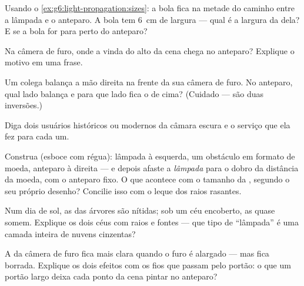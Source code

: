 \begin{exercise}[$\star$]\label{exo:g6:light-propagation:5}
Usando o \cref{ex:g6:light-propagation:sizes}: a bola fica na metade
do caminho entre a lâmpada e o anteparo. A bola tem \qty{6}{cm} de
largura --- qual é a largura da  dela? E se a bola for para
perto do anteparo?
\end{exercise}

\begin{exercise}[$\star$]\label{exo:g6:light-propagation:6}
Na câmera de furo, onde a  vinda do alto da cena chega no
anteparo? Explique o motivo em uma frase.
\end{exercise}

\begin{exercise}[$\star$]\label{exo:g6:light-propagation:7}
Um colega balança a mão direita na frente da sua câmera de furo. No
anteparo, qual lado balança e para que lado fica o de cima? (Cuidado
--- são duas inversões.)
\end{exercise}

\begin{exercise}[$\star$]\label{exo:g6:light-propagation:8}
Diga dois usuários históricos ou modernos da câmara escura e o
serviço que ela fez para cada um.
\end{exercise}

\begin{exercise}[$\star\star$]\label{exo:g6:light-propagation:9}
Construa (esboce com régua): lâmpada à esquerda, um obstáculo em
formato de moeda, anteparo à direita --- e depois afaste a
\emph{lâmpada} para o dobro da distância da moeda, com o anteparo
fixo. O que acontece com o tamanho da , segundo o seu próprio
desenho? Concilie isso com o leque dos raios rasantes.
\end{exercise}

\begin{exercise}[$\star\star$]\label{exo:g6:light-propagation:10}
Num dia de sol, as  das árvores são nítidas; sob um céu
encoberto, as  quase somem. Explique os dois céus com raios e
fontes --- que tipo de ``lâmpada'' é uma camada inteira de nuvens
cinzentas?
\end{exercise}

\begin{exercise}[$\star\star$]\label{exo:g6:light-propagation:11}
A  da câmera de furo fica mais clara quando o furo é alargado
--- mas fica borrada. Explique os dois efeitos com os fios que passam
pelo portão: o que um portão largo deixa cada ponto da cena pintar no
anteparo?
\end{exercise}

